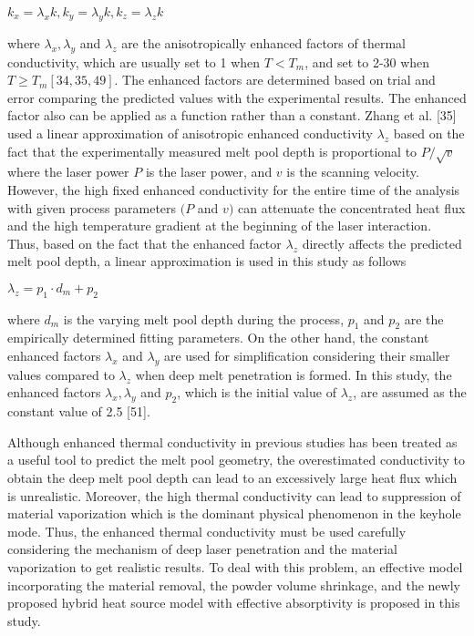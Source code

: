 \documentclass[10pt]{article}
\begin{document}
$k_{x}=\lambda_{x} k, k_{y}=\lambda_{y} k, k_{z}=\lambda_{z} k$

where $\lambda_{x}, \lambda_{y}$ and $\lambda_{z}$ are the anisotropically enhanced factors of thermal conductivity, which are usually set to 1 when $T<T_{m}$, and set to 2-30 when $T \geq T_{m}[34,35,49]$. The enhanced factors are determined based on trial and error comparing the predicted values with the experimental results. The enhanced factor also can be applied as a function rather than a constant. Zhang et al. [35] used a linear approximation of anisotropic enhanced conductivity $\lambda_{z}$ based on the fact that the experimentally measured melt pool depth is proportional to $P / \sqrt{v}$ where the laser power $P$ is the laser power, and $v$ is the scanning velocity. However, the high fixed enhanced conductivity for the entire time of the analysis with given process parameters $(P$ and $v)$ can attenuate the concentrated heat flux and the high temperature gradient at the beginning of the laser interaction. Thus, based on the fact that the enhanced factor $\lambda_{z}$ directly affects the predicted melt pool depth, a linear approximation is used in this study as follows

$\lambda_{z}=p_{1} \cdot d_{m}+p_{2}$

where $d_{m}$ is the varying melt pool depth during the process, $p_{1}$ and $p_{2}$ are the empirically determined fitting parameters. On the other hand, the constant enhanced factors $\lambda_{x}$ and $\lambda_{y}$ are used for simplification considering their smaller values compared to $\lambda_{z}$ when deep melt penetration is formed. In this study, the enhanced factors $\lambda_{x}, \lambda_{y}$ and $p_{2}$, which is the initial value of $\lambda_{z}$, are assumed as the constant value of 2.5 [51].

Although enhanced thermal conductivity in previous studies has been treated as a useful tool to predict the melt pool geometry, the overestimated conductivity to obtain the deep melt pool depth can lead to an excessively large heat flux which is unrealistic. Moreover, the high thermal conductivity can lead to suppression of material vaporization which is the dominant physical phenomenon in the keyhole mode. Thus, the enhanced thermal conductivity must be used carefully considering the mechanism of deep laser penetration and the material vaporization to get realistic results. To deal with this problem, an effective model incorporating the material removal, the powder volume shrinkage, and the newly proposed hybrid heat source model with effective absorptivity is proposed in this study.
\end{document}
